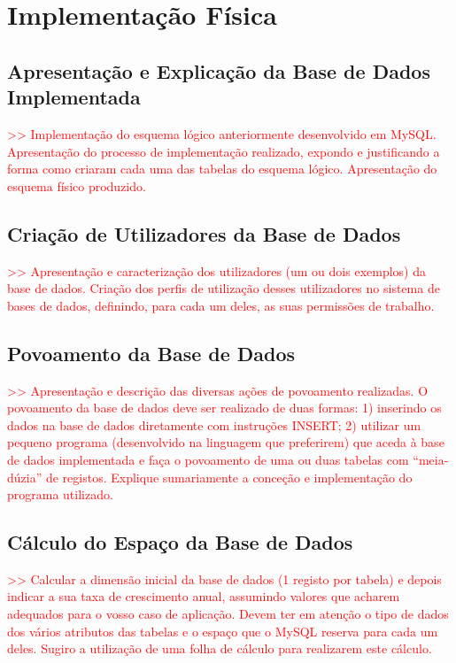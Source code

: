 \documentclass[a4paper,12pt]{scrreprt}
\begin{document}
\chapter{Implementação Física}
\section{Apresentação e Explicação da Base de Dados Implementada}
\textcolor{red}{>> Implementação do esquema lógico anteriormente desenvolvido em MySQL. Apresentação do processo de implementação realizado, expondo e justificando a forma como criaram cada uma das tabelas do esquema lógico. Apresentação do esquema físico produzido.}

\section{Criação de Utilizadores da Base de Dados}
\textcolor{red}{>> Apresentação e caracterização dos utilizadores (um ou dois exemplos) da base de dados. Criação dos perfis de utilização desses utilizadores no sistema de bases de dados, definindo, para cada um deles, as suas permissões de trabalho.}

\section{Povoamento da Base de Dados}
\textcolor{red}{>> Apresentação e descrição das diversas ações de povoamento realizadas. O povoamento da base de dados deve ser realizado de duas formas: 1) inserindo os dados na base de dados diretamente com instruções INSERT; 2) utilizar um pequeno programa (desenvolvido na linguagem que preferirem) que aceda à base de dados implementada e faça o povoamento de uma ou duas tabelas com “meia-dúzia” de registos. Explique sumariamente a conceção e implementação do programa utilizado.}

\section{Cálculo do Espaço da Base de Dados}
\textcolor{red}{>> Calcular a dimensão inicial da base de dados (1 registo por tabela) e depois indicar a sua taxa de crescimento anual, assumindo valores que acharem adequados para o vosso caso de aplicação. Devem ter em atenção o tipo de dados dos vários atributos das tabelas e o espaço que o MySQL reserva para cada um deles. Sugiro a utilização de uma folha de cálculo para realizarem este cálculo.}
\end{document}
